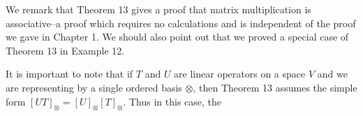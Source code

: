 We remark that Theorem 13 gives a proof that matrix multiplication is associative--a proof which requires no calculations and is independent of the proof we gave in Chapter 1. We should also point out that we proved a special case of Theorem 13 in Example 12.

It is important to note that if \(T\) and \(U\) are linear operators on a space \(V\) and we are representing by a single ordered basis \(\otimes\), then Theorem 13 assumes the simple form \([UT]_{\otimes}=[U]_{\otimes}[T]_{\otimes}\). Thus in this case, the 